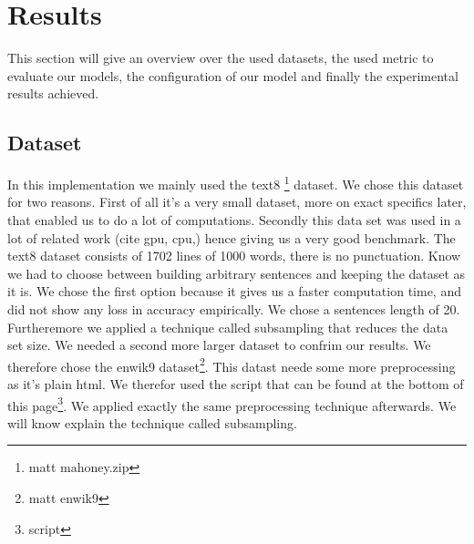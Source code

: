 \chapter{Results}\label{chap:results}



This section will give an overview over the used datasets, the used metric to evaluate our models, the configuration of our model and finally the experimental results achieved.

\section{Dataset}
In this implementation we mainly used the text8 \footnote{matt mahoney.zip} dataset. We chose this dataset for two reasons. First of all it's a very small dataset, more on exact specifics later, that enabled us to do a lot of computations. Secondly this data set was used in a lot of related work (cite gpu, cpu,) hence giving us a very good benchmark. The text8 dataset consists of 1702 lines of 1000 words, there is no punctuation. Know we had to choose between building arbitrary sentences and keeping the dataset as it is. We chose the first option because it gives us a faster computation time, and did not show any loss in accuracy empirically. We chose a sentences length of 20. Furtheremore we applied a technique called subsampling that reduces the data set size. 
We needed a second more larger dataset to confrim our results.  We therefore chose the enwik9 dataset\footnote{matt enwik9}. This datast neede some more preprocessing as it's plain html. We therefor used the script that can be found at the bottom of this page\footnote{script}. We applied exactly the same preprocessing technique afterwards.
We will know explain the technique called subsampling. 


 
 
 
